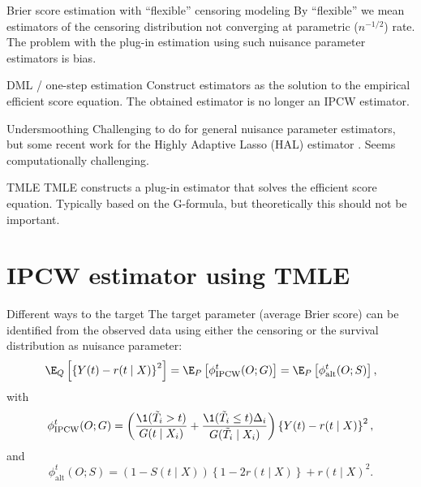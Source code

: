 \documentclass[handout]{beamer}\usepackage{listings}
\begin{document}
\begin{frame}[label={sec:orge6f3bc6}]{Brier score estimation with ``flexible'' censoring modeling}
By ``flexible'' we mean estimators of the censoring distribution not converging at parametric
(\(n^{-1/2}\)) rate. The problem with the plug-in estimation using such nuisance parameter
estimators is \alert{bias}.
\vfill \pause

\begin{block}{DML \small \citep{chernozhukov2017double} \large / one-step estimation}
Construct estimators as the solution to the empirical efficient score equation. The obtained
estimator is no longer an IPCW estimator. \pause
\end{block}

\begin{block}{Undersmoothing}
Challenging to do for general nuisance parameter estimators, but some recent work for the Highly
Adaptive Lasso (HAL) estimator \small
\citep{ertefaie2020nonparametric,van2019efficient}\normalsize. Seems computationally
challenging. \pause
\end{block}

\begin{block}{TMLE \small \citep{van2011targeted,van2006targeted}}
TMLE constructs a \alert{plug-in estimator} that solves the efficient score equation. Typically based
on the G-formula, but theoretically this should not be important.
\end{block}
\end{frame}

\section{IPCW estimator using TMLE}
\label{sec:org9c5e859}
\begin{frame}[label={sec:orgb63cab9}]{Different ways to the target}
The target parameter (average Brier score) can be identified from the observed data using either
the censoring or the survival distribution as nuisance parameter:
\begin{equation*}
  \E_Q\left[ 
    \left\{
      Y(t) - r(t \mid X)
    \right\}^2 \right]
  = \E_P\left[ \phi^t_{\mathrm{IPCW}}(O; G) \right]
  = \E_P\left[ \phi^t_{\mathrm{alt}}(O; S) \right],
\end{equation*}
with
\begin{equation*}
  \phi^t_{\mathrm{IPCW}}(O; G) = 
  \left(
    \frac{\1({\tilde{T}_i >t})}{G(t \mid X_i)} + \frac{\1({\tilde{T}_i\leq
	t})\Delta_i}{G(\tilde{T}_i\mid X_i)}
  \right) \left\{
    Y(t) - r(t \mid X)
  \right\}^2,
\end{equation*}
and
\begin{equation*}
  \phi^t_{\mathrm{alt}}(O; S) = 
  \left(
    1- S(t \mid X)
  \right) \left\{
    1 - 2r(t \mid X) 
  \right\}  + r(t\mid X)^2.
\end{equation*}
\end{frame}
\end{document}
